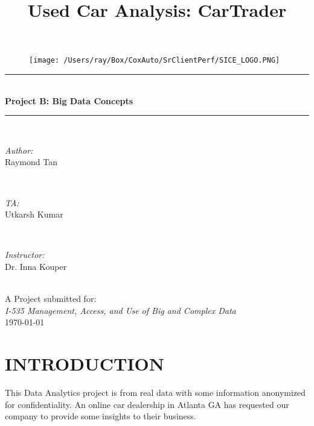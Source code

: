\documentclass[
	12pt, %
	letterpaper, %
]{tPlate}
\begin{document}
\begin{titlepage}
\newcommand{\HRule}{\rule{\linewidth}{0.5mm}}

\begin{figure}
	\centering
         \texttt{[image: /Users/ray/Box/CoxAuto/SrClientPerf/SICE\_LOGO.PNG]}
\end{figure}         

\center 
\makeatletter
\HRule \\[0.6cm]
{\huge \bfseries{Project B: Big Data Concepts}}\\[0.4cm] 
\HRule \\[1.5cm]

\begin{minipage}{0.3\textwidth}
\begin{center} \large
\emph{Author:}\\
\textup{Raymond Tan}
\end{center}
\end{minipage}
~
\begin{minipage}{0.3\textwidth}
\begin{center} \large
\emph{TA:}\\
\textup{Utkarsh Kumar}
\end{center}
\end{minipage}
~
\begin{minipage}{0.3\textwidth}
\begin{center} \large
\emph{Instructor:} \\
\textup{Dr. Inna Kouper}
\end{center}
\end{minipage}\\[3cm]

\makeatother
{\large {A Project submitted for:}}\\[0.5cm]
{\large \emph{I-535 Management, Access, and Use of Big and Complex Data}}\\[0.5cm]
{\large \today}\\[2cm] 

\vfill
\end{titlepage}


\title{Used Car Analysis: CarTrader} %

\cleardoublepage

\section{INTRODUCTION}
This Data Analytics project is from real data with some information anonymized for confidentiality.  
An online car dealership in Atlanta GA has requested our company to provide some insights to their business.\\  
\end{document}

